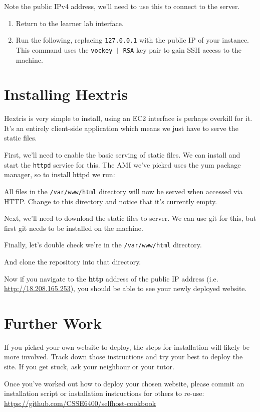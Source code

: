 \documentclass{csse4400}
\begin{document}
Note the public IPv4 address, we'll need to use this to connect to the server.

\begin{enumerate}
    \item Return to the learner lab interface.
    \item Run the following, replacing \texttt{127.0.0.1} with the public IP of your instance.
          This command uses the \texttt{vockey | RSA} key pair to gain SSH access to the machine.
\end{enumerate}

\section{Installing Hextris}
Hextris is very simple to install, using an EC2 interface is perhaps overkill for it.
It's an entirely client-side application which means we just have to serve the static files.

First, we'll need to enable the basic serving of static files.
We can install and start the \texttt{httpd} service for this.
The AMI we've picked uses the yum package manager, so to install httpd we run:


All files in the \texttt{/var/www/html} directory will now be served when accessed via HTTP.
Change to this directory and notice that it's currently empty.

Next, we'll need to download the static files to server.
We can use git for this, but first git needs to be installed on the machine.


Finally, let's double check we're in the \texttt{/var/www/html} directory.


And clone the repository into that directory.


Now if you navigate to the \textbf{http} address of the public IP address (i.e. \url{http://18.208.165.253}), you should be able to see your newly deployed website.

\section{Further Work}
If you picked your own website to deploy, the steps for installation will likely be more involved.
Track down those instructions and try your best to deploy the site.
If you get stuck, ask your neighbour or your tutor.

Once you've worked out how to deploy your chosen website,
please commit an installation script or installation instructions for others to re-use:
\url{https://github.com/CSSE6400/selfhost-cookbook}



\end{document}
